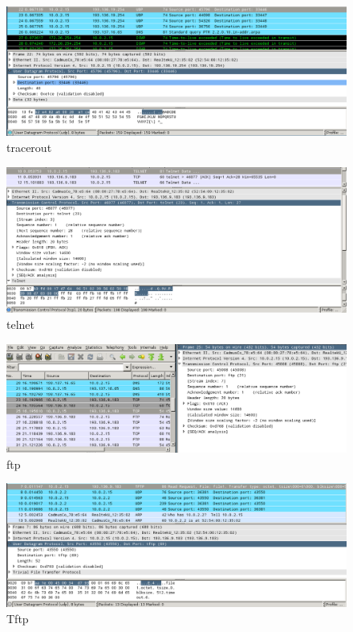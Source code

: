 \documentclass[a4paper]{report}
\begin{document}
\begin{figure}[H]
    \centering 
    \includegraphics[width=\textwidth]{images/tracerout.png}  
    \caption{tracerout}
    \label{fig:tracerout}
\end{figure}

\begin{figure}[H]
    \centering 
    \includegraphics[width=\textwidth]{images/telnet.png}  
    \caption{telnet}
    \label{fig:telnet}
\end{figure}

\begin{figure}[H]
    \centering 
    \includegraphics[width=\textwidth]{images/ftp.png}  
    \caption{ftp}
    \label{fig:ftp}
\end{figure}

\begin{figure}[H]
    \centering 
    \includegraphics[width=\textwidth]{images/tftp.png}  
    \caption{Tftp}
    \label{fig:tftp}
\end{figure}
\end{document}
